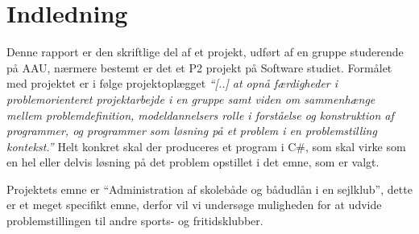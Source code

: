 \chapter{Indledning}\label{chap:indledning}



Denne rapport er den skriftlige del af et projekt, udført af en gruppe studerende på AAU, nærmere bestemt er det et P2 projekt på Software studiet. Formålet med projektet er i følge projektoplægget \textit{``[..] at opnå færdigheder i problemorienteret projektarbejde i en gruppe samt viden om sammenhænge mellem problemdefinition, modeldannelsers rolle i forståelse og konstruktion af programmer, og programmer som løsning på et problem i en problemstilling kontekst.''} Helt konkret skal der produceres et program i C\#, som skal virke som en hel eller delvis løsning på det problem opstillet i det emne, som er valgt. 

Projektets emne er ``Administration af skolebåde og bådudlån i en sejlklub'', dette er et meget specifikt emne, derfor vil vi undersøge muligheden for at udvide problemstillingen til andre sports- og fritidsklubber. 

